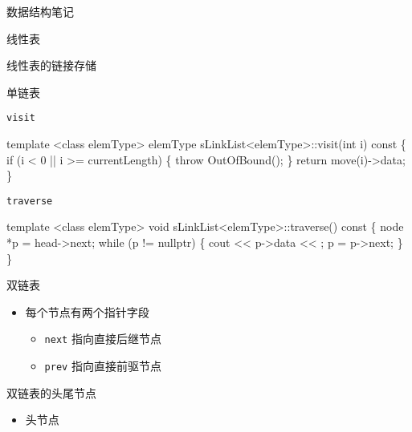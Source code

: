 \documentclass[
  ignorenonframetext,
]{beamer}
\newenvironment{Shaded}{}{}
\newcommand{\NormalTok}[1]{#1}
\providecommand{\tightlist}{%
  \setlength{\itemsep}{0pt}\setlength{\parskip}{0pt}}
\begin{document}
\begin{frame}[fragile]{数据结构笔记}
\begin{block}{线性表}
\begin{block}{线性表的链接存储}
\begin{block}{单链表}
\begin{block}{\texttt{visit}}
\begin{Shaded}
\begin{Highlighting}[]
\NormalTok{template \textless{}class elemType\textgreater{}}
\NormalTok{elemType sLinkList\textless{}elemType\textgreater{}::visit(int i) const}
\NormalTok{\{}
\NormalTok{  if (i \textless{} 0 || i \textgreater{}= currentLength)}
\NormalTok{  \{}
\NormalTok{    throw OutOfBound();}
\NormalTok{  \}}
\NormalTok{  return move(i){-}\textgreater{}data;}
\NormalTok{\}}
\end{Highlighting}
\end{Shaded}
\end{block}

\begin{block}{\texttt{traverse}}
\protect{}\label{traverse-1}
\begin{Shaded}
\begin{Highlighting}[]
\NormalTok{template \textless{}class elemType\textgreater{}}
\NormalTok{void sLinkList\textless{}elemType\textgreater{}::traverse() const}
\NormalTok{\{}
\NormalTok{  node *p = head{-}\textgreater{}next;}
\NormalTok{  while (p != nullptr)}
\NormalTok{  \{}
\NormalTok{    cout \textless{}\textless{} p{-}\textgreater{}data \textless{}\textless{} \textquotesingle{} \textquotesingle{};}
\NormalTok{    p = p{-}\textgreater{}next;}
\NormalTok{  \}}
\NormalTok{\}}
\end{Highlighting}
\end{Shaded}
\end{block}
\end{block}

\begin{block}{双链表}
\protect{}\label{ux53ccux94feux8868}
\begin{itemize}
\tightlist
\item
  每个节点有两个指针字段

  \begin{itemize}
  \tightlist
  \item
    \texttt{next} 指向直接后继节点
  \item
    \texttt{prev} 指向直接前驱节点
  \end{itemize}
\end{itemize}

\begin{block}{双链表的头尾节点}
\protect{}\label{ux53ccux94feux8868ux7684ux5934ux5c3eux8282ux70b9}
\begin{itemize}
\tightlist
\item
  头节点


\end{itemize}
\end{block}
\end{block}
\end{block}
\end{block}
\end{frame}
\end{document}
